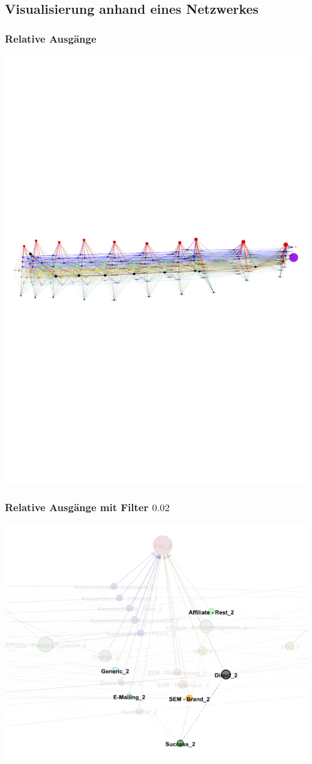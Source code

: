 \subsection{Visualisierung anhand eines Netzwerkes}

\begin{frame}\frametitle{Relative Ausgänge}
	\centering\includegraphics[scale=0.3]{out_labels.pdf}
\end{frame}

\begin{frame}\frametitle{Relative Ausgänge mit Filter $0.02$}
	\centering\includegraphics[scale=0.3]{out_filter_2_succ.png}
\end{frame}

